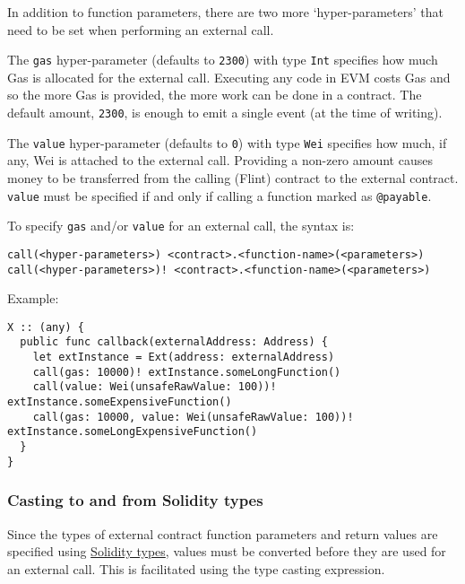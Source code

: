 In addition to function parameters, there are two more `hyper-parameters' that need to be set when performing an external call.

The \texttt{gas} hyper-parameter (defaults to \texttt{2300}) with type \texttt{Int} specifies how much Gas is allocated for the external call. Executing any code in EVM costs Gas and so the more Gas is provided, the more work can be done in a contract. The default amount, \texttt{2300}, is enough to emit a single event (at the time of writing).

The \texttt{value} hyper-parameter (defaults to \texttt{0}) with type \texttt{Wei} specifies how much, if any, Wei is attached to the external call. Providing a non-zero amount causes money to be transferred from the calling (Flint) contract to the external contract. \texttt{value} must be specified if and only if calling a function marked as \texttt{@payable}.

To specify \texttt{gas} and/or \texttt{value} for an external call, the syntax is:

\begin{verbatim}
call(<hyper-parameters>) <contract>.<function-name>(<parameters>)
call(<hyper-parameters>)! <contract>.<function-name>(<parameters>)
\end{verbatim}

Example:

\begin{verbatim}
X :: (any) {
  public func callback(externalAddress: Address) {
    let extInstance = Ext(address: externalAddress)
    call(gas: 10000)! extInstance.someLongFunction()
    call(value: Wei(unsafeRawValue: 100))! extInstance.someExpensiveFunction()
    call(gas: 10000, value: Wei(unsafeRawValue: 100))! extInstance.someLongExpensiveFunction()
  }
}
\end{verbatim}

\subsubsection{Casting to and from Solidity types}
\label{sec:appendix-b-casting-to-and-from-solidity-types}

Since the types of external contract function parameters and return values are specified using \hyperref[sec:appendix-b-solidity-types]{Solidity types}, values must be converted before they are used for an external call. This is facilitated using the type casting expression.

